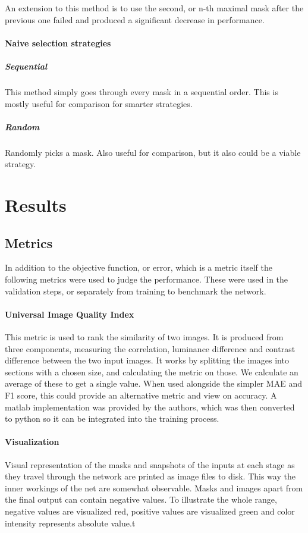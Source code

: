 \documentclass[12pt]{report}
\begin{document}
An extension to this method is to use the second, or n-th maximal mask after the previous one failed and produced a significant decrease in performance.
\subsubsection{Naive selection strategies}
\paragraph{Sequential}This method simply goes through every mask in a sequential order. This is mostly useful for comparison for smarter strategies.
\paragraph{Random}
Randomly picks a mask. Also useful for comparison, but it also could be a viable strategy.
\chapter{Results}
\section{Metrics}
In addition to the objective function, or error, which is a metric itself the following metrics were used to judge the performance. These were used in the validation steps, or separately from training to benchmark the network.
\subsubsection{Universal Image Quality Index}This metric is used to rank the similarity of two images. It is produced from three components, measuring the correlation, luminance difference and contrast difference between the two input images. It works by splitting the images into sections with a chosen size, and calculating the metric on those. We calculate an average of these to get a single value. When used alongside the simpler MAE and F1 score, this could provide an alternative metric and view on accuracy. A matlab implementation was provided by the authors, which was then converted to python so it can be integrated into the training process.
\subsubsection{Visualization}Visual representation of the masks and snapshots of the inputs at each stage as they travel through the network are printed as image files to disk. This way the inner workings of the net are somewhat observable. Masks and images apart from the final output can contain negative values. To illustrate the whole range, negative values are visualized red, positive values are visualized green and color intensity represents absolute value.t
\end{document}
